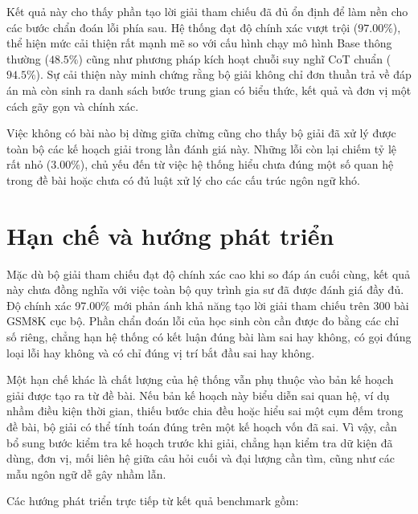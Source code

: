 \documentclass[12pt,a4paper]{article}
\begin{document}
Kết quả này cho thấy phần tạo lời giải tham chiếu đã đủ ổn định để làm nền cho
các bước chẩn đoán lỗi phía sau. Hệ thống đạt độ chính xác vượt trội ($97.00\%$), 
thể hiện mức cải thiện rất mạnh mẽ so với cấu hình chạy mô hình Base thông thường 
($48.5\%$) cũng như phương pháp kích hoạt chuỗi suy nghĩ CoT chuẩn ($94.5\%$). 
Sự cải thiện này minh chứng rằng bộ giải không chỉ đơn thuần trả về đáp án 
mà còn sinh ra danh sách bước trung gian có biểu thức, kết quả và đơn vị một cách 
gãy gọn và chính xác. 

Việc không có bài nào bị dừng giữa chừng cũng cho thấy bộ giải đã xử lý được 
toàn bộ các kế hoạch giải trong lần đánh giá này. Những lỗi còn lại chiếm tỷ lệ 
rất nhỏ ($3.00\%$), chủ yếu đến từ việc hệ thống hiểu chưa đúng một số quan hệ 
trong đề bài hoặc chưa có đủ luật xử lý cho các cấu trúc ngôn ngữ khó.



\section{Hạn chế và hướng phát triển}

Mặc dù bộ giải tham chiếu đạt độ chính xác cao khi so đáp án cuối cùng, kết quả
này chưa đồng nghĩa với việc toàn bộ quy trình gia sư đã được đánh giá đầy đủ.
Độ chính xác 97.00\% mới phản ánh khả năng tạo lời giải tham chiếu trên 300 bài
GSM8K cục bộ. Phần chẩn đoán lỗi của học sinh còn cần được đo bằng các chỉ số
riêng, chẳng hạn hệ thống có kết luận đúng bài làm sai hay không, có gọi đúng
loại lỗi hay không và có chỉ đúng vị trí bắt đầu sai hay không.

Một hạn chế khác là chất lượng của hệ thống vẫn phụ thuộc vào bản kế hoạch giải
được tạo ra từ đề bài. Nếu bản kế hoạch này biểu diễn sai quan hệ, ví dụ nhầm
điều kiện thời gian, thiếu bước chia đều hoặc hiểu sai một cụm đếm trong đề bài,
bộ giải có thể tính toán đúng trên một kế hoạch vốn đã sai. Vì vậy, cần bổ sung
bước kiểm tra kế hoạch trước khi giải, chẳng hạn kiểm tra dữ kiện đã dùng, đơn
vị, mối liên hệ giữa câu hỏi cuối và đại lượng cần tìm, cũng như các mẫu ngôn
ngữ dễ gây nhầm lẫn.

Các hướng phát triển trực tiếp từ kết quả benchmark gồm:
\end{document}
